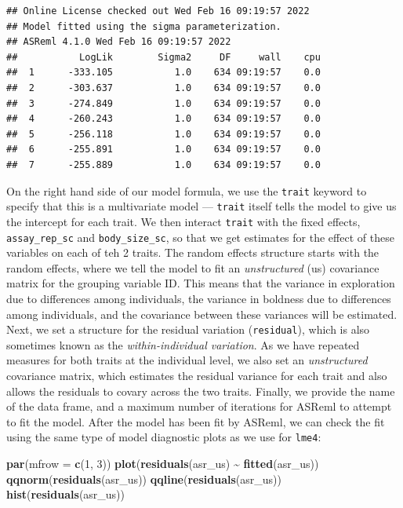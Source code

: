 \documentclass[
  12pt,
]{book}
\newenvironment{Shaded}{\begin{snugshade}}{\end{snugshade}}
\newcommand{\DataTypeTok}[1]{\textcolor[rgb]{0.13,0.29,0.53}{#1}}
\newcommand{\DecValTok}[1]{\textcolor[rgb]{0.00,0.00,0.81}{#1}}
\newcommand{\KeywordTok}[1]{\textcolor[rgb]{0.13,0.29,0.53}{\textbf{#1}}}
\newcommand{\NormalTok}[1]{#1}
\newcommand{\OperatorTok}[1]{\textcolor[rgb]{0.81,0.36,0.00}{\textbf{#1}}}
\newcommand{\StringTok}[1]{\textcolor[rgb]{0.31,0.60,0.02}{#1}}
\begin{document}
\begin{verbatim}
## Online License checked out Wed Feb 16 09:19:57 2022
## Model fitted using the sigma parameterization.
## ASReml 4.1.0 Wed Feb 16 09:19:57 2022
##           LogLik        Sigma2     DF     wall    cpu
##  1      -333.105           1.0    634 09:19:57    0.0
##  2      -303.637           1.0    634 09:19:57    0.0
##  3      -274.849           1.0    634 09:19:57    0.0
##  4      -260.243           1.0    634 09:19:57    0.0
##  5      -256.118           1.0    634 09:19:57    0.0
##  6      -255.891           1.0    634 09:19:57    0.0
##  7      -255.889           1.0    634 09:19:57    0.0
\end{verbatim}

On the right hand side of our model formula, we use the \texttt{trait} keyword to specify that this is a multivariate model --- \texttt{trait} itself tells the model to give us the intercept for each trait. We then interact \texttt{trait} with the fixed effects, \texttt{assay\_rep\_sc} and \texttt{body\_size\_sc}, so that we get estimates for the effect of these variables on each of teh 2 traits.
The random effects structure starts with the random effects, where we tell the model to fit an \emph{unstructured} (us) covariance matrix for the grouping variable ID. This means that the variance in exploration due to differences among individuals, the variance in boldness due to differences among individuals, and the covariance between these variances will be estimated.
Next, we set a structure for the residual variation (\texttt{residual}), which is also sometimes known as the \emph{within-individual variation}. As we have repeated measures for both traits at the individual level, we also set an \emph{unstructured} covariance matrix, which estimates the residual variance for each trait and also allows the residuals
to covary across the two traits.
Finally, we provide the name of the data frame, and a maximum number of iterations for ASReml to attempt to fit the model.
After the model has been fit by ASReml, we can check the fit using the same type of model diagnostic plots as we use for \texttt{lme4}:

\begin{Shaded}
\begin{Highlighting}[]
\KeywordTok{par}\NormalTok{(}\DataTypeTok{mfrow =} \KeywordTok{c}\NormalTok{(}\DecValTok{1}\NormalTok{, }\DecValTok{3}\NormalTok{))}
\KeywordTok{plot}\NormalTok{(}\KeywordTok{residuals}\NormalTok{(asr\_us) }\OperatorTok{\textasciitilde{}}\StringTok{ }\KeywordTok{fitted}\NormalTok{(asr\_us))}
\KeywordTok{qqnorm}\NormalTok{(}\KeywordTok{residuals}\NormalTok{(asr\_us))}
\KeywordTok{qqline}\NormalTok{(}\KeywordTok{residuals}\NormalTok{(asr\_us))}
\KeywordTok{hist}\NormalTok{(}\KeywordTok{residuals}\NormalTok{(asr\_us))}
\end{Highlighting}
\end{Shaded}
\end{document}
